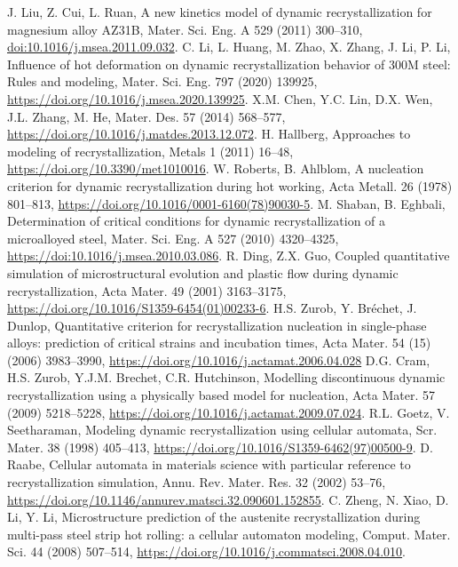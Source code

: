 \documentclass[a4paper, 11pt, dvipsnames]{article}
\begin{document}
\begin{thebibliography}{99}
 J. Liu, Z. Cui, L. Ruan, A new kinetics model of dynamic recrystallization for magnesium alloy AZ31B, Mater. Sci. Eng. A 529 (2011) 300--310, \url{doi:10.1016/j.msea.2011.09.032}.
 C. Li, L. Huang, M. Zhao, X. Zhang, J. Li, P. Li, {Influence of hot deformation on dynamic recrystallization behavior of 300M steel: Rules and modeling},  Mater. Sci. Eng. 797 (2020) 139925, \url{https://doi.org/10.1016/j.msea.2020.139925}.
 X.M. Chen, Y.C. Lin, D.X. Wen, J.L. Zhang, M. He, Mater. Des. 57 (2014) 568--577, \url{https://doi.org/10.1016/j.matdes.2013.12.072}.
 H. Hallberg, {Approaches to modeling of recrystallization}, Metals 1 (2011)  16--48, \url{https://doi.org/10.3390/met1010016}.
 W. Roberts, B. Ahlblom, {A nucleation criterion for dynamic recrystallization during hot working}, Acta Metall. 26 (1978) 801--813, \url{https://doi.org/10.1016/0001-6160(78)90030-5}.
 M. Shaban, B. Eghbali, {Determination of critical conditions for dynamic recrystallization of a microalloyed steel}, Mater. Sci. Eng. A 527 (2010) 4320--4325, \url{https://doi:10.1016/j.msea.2010.03.086}.
 R. Ding, Z.X. Guo, {Coupled quantitative simulation of microstructural evolution and plastic flow during dynamic recrystallization}, Acta Mater. 49 (2001) 3163--3175, \url{https://doi.org/10.1016/S1359-6454(01)00233-6}.
 H.S. Zurob, Y. Bréchet, J. Dunlop, {Quantitative criterion for recrystallization nucleation in single-phase alloys: prediction of critical strains and incubation times}, Acta Mater. 54 (15) (2006) 3983--3990, \url{https://doi.org/10.1016/j.actamat.2006.04.028}
 D.G. Cram, H.S. Zurob, Y.J.M. Brechet, C.R. Hutchinson, {Modelling discontinuous dynamic recrystallization using a physically based model for nucleation}, Acta Mater. 57 (2009) 5218--5228, \url{https://doi.org/10.1016/j.actamat.2009.07.024}.
 R.L. Goetz, V. Seetharaman, {Modeling dynamic recrystallization using cellular automata}, Scr. Mater. 38 (1998) 405--413,  \url{https://doi.org/10.1016/S1359-6462(97)00500-9}.
 D. Raabe, {Cellular automata in materials science with particular reference to recrystallization simulation}, Annu. Rev. Mater. Res. 32  (2002) 53--76, \url{https://doi.org/10.1146/annurev.matsci.32.090601.152855}.
 C. Zheng, N. Xiao, D. Li, Y. Li, {Microstructure prediction of the austenite recrystallization during multi-pass steel strip hot rolling: a cellular automaton modeling}, Comput. Mater. Sci. 44 (2008) 507--514, \url{https://doi.org/10.1016/j.commatsci.2008.04.010}.

\end{thebibliography}
\end{document}
